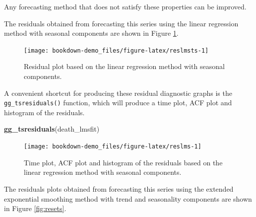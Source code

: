 \documentclass[]{book}
\newenvironment{Shaded}{\begin{snugshade}}{\end{snugshade}}
\newcommand{\KeywordTok}[1]{\textcolor[rgb]{0.13,0.29,0.53}{\textbf{#1}}}
\newcommand{\DataTypeTok}[1]{\textcolor[rgb]{0.13,0.29,0.53}{#1}}
\newcommand{\StringTok}[1]{\textcolor[rgb]{0.31,0.60,0.02}{#1}}
\newcommand{\OperatorTok}[1]{\textcolor[rgb]{0.81,0.36,0.00}{\textbf{#1}}}
\newcommand{\NormalTok}[1]{#1}
\begin{document}
Any forecasting method that does not satisfy these properties can be
improved.

The residuals obtained from forecasting this series using the linear
regression method with seasonal components are shown in Figure
\ref{fig:reslmsts}.

\begin{Shaded}
\end{Shaded}

\begin{figure}

{\centering \texttt{[image: bookdown-demo\_files/figure-latex/reslmsts-1]} 

}

\caption{Residual plot based on the linear regression method with seasonal components.}\label{fig:reslmsts}
\end{figure}

A convenient shortcut for producing these residual diagnostic graphs is
the \texttt{gg\_tsresiduals()} function, which will produce a time plot,
ACF plot and histogram of the residuals.

\begin{Shaded}
\begin{Highlighting}[]
\KeywordTok{gg_tsresiduals}\NormalTok{(death_lmsfit)}
\end{Highlighting}
\end{Shaded}

\begin{figure}

{\centering \texttt{[image: bookdown-demo\_files/figure-latex/reslms-1]} 

}

\caption{Time plot, ACF plot and histogram of the residuals based on the linear regression method with seasonal components.}\label{fig:reslms}
\end{figure}

The residuals plots obtained from forecasting this series using the
extended exponential smoothing method with trend and seasonality
components are shown in Figure \ref{fig:resets}.
\end{document}
